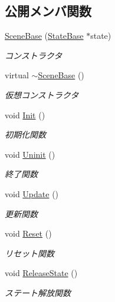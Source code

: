 \subsection*{公開メンバ関数}
\begin{DoxyCompactItemize}
\item 
\mbox{\hyperlink{class_scene_base_aeafd60485ad8b2191f40da3013d50f2c}{Scene\+Base}} (\mbox{\hyperlink{class_scene_base_1_1_state_base}{State\+Base}} $\ast$state)
\begin{DoxyCompactList}\small\item\em コンストラクタ \end{DoxyCompactList}\item 
virtual \mbox{\hyperlink{class_scene_base_a187dd160e5a16909bcc6529851e38318}{$\sim$\+Scene\+Base}} ()
\begin{DoxyCompactList}\small\item\em 仮想コンストラクタ \end{DoxyCompactList}\item 
void \mbox{\hyperlink{class_scene_base_a494ba624fdd95b296e4487ed1a34f47b}{Init}} ()
\begin{DoxyCompactList}\small\item\em 初期化関数 \end{DoxyCompactList}\item 
void \mbox{\hyperlink{class_scene_base_aa4babf42cf2c2b6e17bb3ddd6ff13d31}{Uninit}} ()
\begin{DoxyCompactList}\small\item\em 終了関数 \end{DoxyCompactList}\item 
void \mbox{\hyperlink{class_scene_base_a71f332a32d99548b3aa912210a2dd0b0}{Update}} ()
\begin{DoxyCompactList}\small\item\em 更新関数 \end{DoxyCompactList}\item 
void \mbox{\hyperlink{class_scene_base_ae2dc09554ec21ffe231fa73a6cdd7ca1}{Reset}} ()
\begin{DoxyCompactList}\small\item\em リセット関数 \end{DoxyCompactList}\item 
void \mbox{\hyperlink{class_scene_base_aaa1e66fbfc6740b069d715b325915b97}{Release\+State}} ()
\begin{DoxyCompactList}\small\item\em ステート解放関数 \end{DoxyCompactList}\item 

\end{DoxyCompactItemize}
